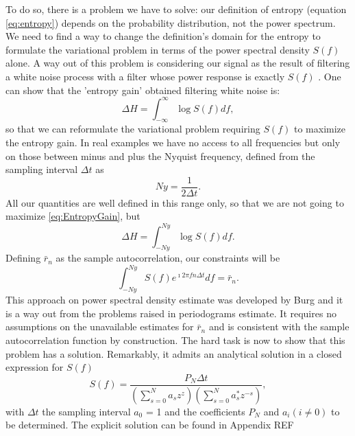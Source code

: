 \documentclass[twocolumn,showpacs,preprintnumbers,nofootinbib,prd,
superscriptaddress,10pt]{revtex4-1}
\begin{document}
To do so, there is a problem we have to solve: our definition of entropy (equation \ref{eq:entropy}) depends on the probability distribution, not the power spectrum. We need to find a way to change the definition's domain for the entropy to formulate the variational problem in terms of the power spectral density $S(f)$ alone. A way out of this problem is considering our signal as the result of filtering a white noise process with a filter whose power response is exactly $S(f)$ \cite{AblesMESA}. One can show that the 'entropy gain' obtained filtering white noise is: 
\begin{equation}\label{eq:EntropyGain}
    \Delta H = \int_{-\infty}^{\infty}\log S(f) df , 
\end{equation}
so that we can reformulate the variational problem requiring $S(f)$ to maximize the entropy gain. In real examples we have no access to all frequencies but only on those between minus and plus the Nyquist frequency, defined from the sampling interval $\Delta t$ as 
\begin{equation}
    Ny = \frac{1}{2 \Delta t}.
\end{equation}
All our quantities are well defined in this range only, so that we are not going to maximize \ref{eq:EntropyGain}, but
\begin{equation}\label{eq:EntropyGain2}
    \Delta H = \int_{- Ny}^{Ny}\log S(f) df.
\end{equation}
Defining $\bar r_n$ as the sample autocorrelation, our constraints will be
\begin{equation}\label{eq:MaxConstraint}
    \int_{-Ny}^{Ny} S(f) e^{\imath 2 \pi f n \Delta t} df = \bar r_{n}.
\end{equation}
This approach on power spectral density estimate was developed by Burg \cite{burg1975maximum} and it is a way out from the problems raised in periodograms estimate. It requires no assumptions on the unavailable estimates for $\bar r_n$ and is consistent with the sample autocorrelation function by construction. The hard task is now to show that this problem has a solution. Remarkably, it admits an analytical solution in a closed expression for $S(f)$ 
\begin{equation}\label{eq:MESApsd}
    S(f) = \frac{P_N \Delta t}{\left(\sum_{s=0}^N a_s z^z\right)\left(\sum_{s = 0}^N a^*_s z^{-s}\right)}, 
\end{equation}
with $\Delta t$ the sampling interval $a_0$ = 1 and the coefficients $P_N$ and $a_i (i \neq 0)$ to be determined. The explicit solution can be found in Appendix REF
\end{document}
